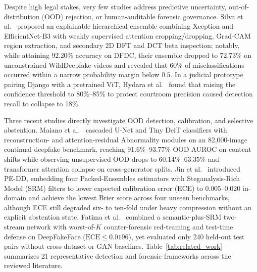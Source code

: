 \documentclass[final,5p,times,twocolumn,numafflabel]{elsarticle}
\begin{document}
Despite high legal stakes, very few studies address predictive uncertainty, out-of-distribution (OOD) rejection, or human-auditable forensic governance. Silva et al.\ \cite{Silva_2022} proposed an explainable hierarchical ensemble combining Xception and EfficientNet-B3 with weakly supervised attention cropping/dropping, Grad-CAM region extraction, and secondary 2D DFT and DCT beta inspection; notably, while attaining 92.20\% accuracy on DFDC, their ensemble dropped to 72.73\% on unconstrained WildDeepfake videos and revealed that 60\% of misclassifications occurred within a narrow probability margin below $0.5$. In a judicial prototype pairing Django with a pretrained ViT, Hydara et al.\ \cite{Hydara_2024} found that raising the confidence threshold to 80\%--85\% to protect courtroom precision caused detection recall to collapse to 18\%.

Three recent studies directly investigate OOD detection, calibration, and selective abstention. Maiano et al.\ \cite{Maiano_2026} cascaded U-Net and Tiny DeiT classifiers with reconstruction- and attention-residual Abnormality modules on an 82,000-image continual deepfake benchmark, reaching 91.6\%--93.77\% OOD AUROC on content shifts while observing unsupervised OOD drops to 60.14\%--63.35\% and transformer attention collapse on cross-generator splits. Jin et al.\ \cite{Jin_2025} introduced PE-DD, embedding four Packed-Ensembles estimators with Steganalysis-Rich Model (SRM) filters to lower expected calibration error (ECE) to $0.005$--$0.020$ in-domain and achieve the lowest Brier score across four unseen benchmarks, although ECE still degraded six- to ten-fold under heavy compression without an explicit abstention state. Fatima et al.\ \cite{Fatima_2026} combined a semantic-plus-SRM two-stream network with worst-of-$K$ counter-forensic red-teaming and test-time defense on DeepFakeFace ($\text{ECE}\le 0.0196$), yet evaluated only 240 held-out test pairs without cross-dataset or GAN baselines. Table~\ref{tab:related_work} summarizes 21 representative detection and forensic frameworks across the reviewed literature.
\end{document}
